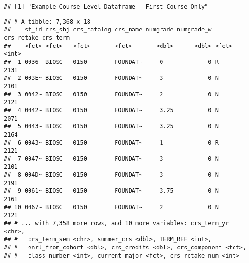 \documentclass[]{article}
\newenvironment{Shaded}{\begin{snugshade}}{\end{snugshade}}
\newcommand{\KeywordTok}[1]{\textcolor[rgb]{0.13,0.29,0.53}{\textbf{#1}}}
\newcommand{\DataTypeTok}[1]{\textcolor[rgb]{0.13,0.29,0.53}{#1}}
\newcommand{\DecValTok}[1]{\textcolor[rgb]{0.00,0.00,0.81}{#1}}
\newcommand{\StringTok}[1]{\textcolor[rgb]{0.31,0.60,0.02}{#1}}
\newcommand{\CommentTok}[1]{\textcolor[rgb]{0.56,0.35,0.01}{\textit{#1}}}
\newcommand{\OtherTok}[1]{\textcolor[rgb]{0.56,0.35,0.01}{#1}}
\newcommand{\OperatorTok}[1]{\textcolor[rgb]{0.81,0.36,0.00}{\textbf{#1}}}
\newcommand{\NormalTok}[1]{#1}
\begin{document}
\begin{Shaded}
\end{Shaded}

\begin{verbatim}
## [1] "Example Course Level Dataframe - First Course Only"
\end{verbatim}

\begin{verbatim}
## # A tibble: 7,368 x 18
##    st_id crs_sbj crs_catalog crs_name numgrade numgrade_w crs_retake crs_term
##    <fct> <fct>   <fct>       <fct>       <dbl>      <dbl> <fct>         <int>
##  1 0036~ BIOSC   0150        FOUNDAT~     0             0 R              2131
##  2 003E~ BIOSC   0150        FOUNDAT~     3             0 N              2101
##  3 0042~ BIOSC   0150        FOUNDAT~     2             0 N              2121
##  4 0042~ BIOSC   0150        FOUNDAT~     3.25          0 N              2071
##  5 0043~ BIOSC   0150        FOUNDAT~     3.25          0 N              2164
##  6 0043~ BIOSC   0150        FOUNDAT~     1             0 R              2121
##  7 0047~ BIOSC   0150        FOUNDAT~     3             0 N              2101
##  8 004D~ BIOSC   0150        FOUNDAT~     3             0 N              2191
##  9 0061~ BIOSC   0150        FOUNDAT~     3.75          0 N              2161
## 10 0067~ BIOSC   0150        FOUNDAT~     2             0 N              2121
## # ... with 7,358 more rows, and 10 more variables: crs_term_yr <chr>,
## #   crs_term_sem <chr>, summer_crs <dbl>, TERM_REF <int>,
## #   enrl_from_cohort <dbl>, crs_credits <dbl>, crs_component <fct>,
## #   class_number <int>, current_major <fct>, crs_retake_num <int>
\end{verbatim}
\end{document}
